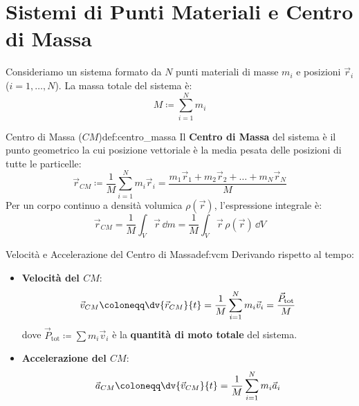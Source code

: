 \vspace{0.5em}

\section{Sistemi di Punti Materiali e Centro di Massa}
\label{sec:centro_massa}

Consideriamo un sistema formato da $N$ punti materiali di masse $m_i$ e posizioni $\vec{r}_i$ ($i = 1, \dots, N$). La massa totale del sistema è:
\begin{equation}
    M \coloneqq \sum_{i=1}^N m_i
\end{equation}

\begin{definizione}{Centro di Massa ($CM$)}{def:centro_massa}
Il \textbf{Centro di Massa} del sistema è il punto geometrico la cui posizione vettoriale è la media pesata delle posizioni di tutte le particelle:
\begin{equation}
    \vec{r}_{CM} \coloneqq \frac{1}{M}\sum_{i=1}^N m_i \vec{r}_i = \frac{m_1\vec{r}_1 + m_2\vec{r}_2 + \dots + m_N\vec{r}_N}{M}
    \label{eq:rcm}
\end{equation}
Per un corpo continuo a densità volumica $\rho(\vec{r})$, l'espressione integrale è:
\begin{equation}
    \vec{r}_{CM} = \frac{1}{M}\int_V \vec{r}\,\dd m = \frac{1}{M}\int_V \vec{r}\,\rho(\vec{r})\,\dd V
    \label{eq:rcm_continuo}
\end{equation}
\end{definizione}

\begin{definizione}{Velocità e Accelerazione del Centro di Massa}{def:vcm}
Derivando rispetto al tempo:
\begin{itemize}
    \item \textbf{Velocità del $CM$}:
    \begin{equation}
        \vec{v}_{CM} \coloneqq \dv{\vec{r}_{CM}}{t} = \frac{1}{M}\sum_{i=1}^N m_i \vec{v}_i = \frac{\vec{P}_{\text{tot}}}{M}
        \label{eq:vcm}
    \end{equation}
    dove $\vec{P}_{\text{tot}} \coloneqq \sum m_i \vec{v}_i$ è la \textbf{quantità di moto totale} del sistema.
    \item \textbf{Accelerazione del $CM$}:
    \begin{equation}
        \vec{a}_{CM} \coloneqq \dv{\vec{v}_{CM}}{t} = \frac{1}{M}\sum_{i=1}^N m_i \vec{a}_i
        \label{eq:acm}
    \end{equation}
\end{itemize}
\end{definizione}

